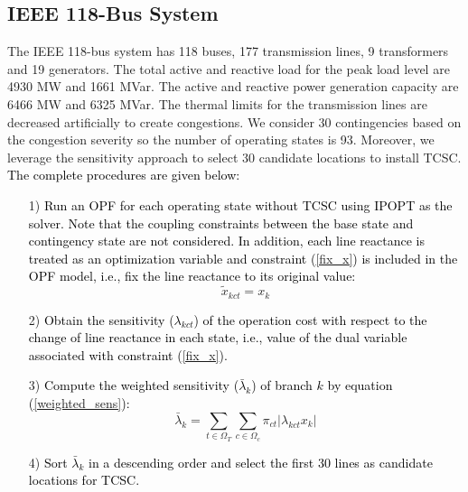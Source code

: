 \documentclass[journal]{IEEEtran}
\begin{document}
\subsection{IEEE 118-Bus System}
The IEEE 118-bus system has 118 buses, 177 transmission lines, 9 transformers and 19 generators. The total active and reactive load for the peak load level are 4930 MW and 1661 MVar. The active and reactive power generation capacity are 6466 MW and 6325 MVar. The thermal limits for the transmission lines are decreased artificially to create congestions. We consider 30 contingencies based on the congestion severity \cite{mybibb:automatic_contingency} so the number of operating states is 93. Moreover, we leverage the sensitivity approach \cite{mybibb:PSO_SQP_FACTS} to select 30 candidate locations to install TCSC. \textcolor{black}{The complete procedures are given below:}
\begin{enumerate}
	\item [1)] 	\textcolor{black}{Run an OPF for each operating state without TCSC using IPOPT as the solver. Note that the coupling constraints between the base state and contingency state are not considered. In addition, each line reactance is treated as an optimization variable and constraint (\ref{fix_x}) is included in the OPF model, i.e., fix the line reactance to its original value:}
	\begin{equation}
	\tilde{x}_{kct}=x_k  \label{fix_x}	
	\end{equation}
     \item [2)]  \textcolor{black}{Obtain the sensitivity ($\lambda_{kct}$) of the operation cost with respect to the change of line reactance in each state, i.e., value of the dual variable associated with constraint (\ref{fix_x}).}
     \item [3)] \textcolor{black}{Compute the weighted sensitivity ($\bar{\lambda}_k$) of branch $k$ by equation (\ref{weighted_sens}):}
     \begin{equation}
     \bar{\lambda}_k=\sum_{t\in \Omega_T} \sum_{c \in \Omega_c}\pi_{ct}|\lambda_{kct}x_k|  \label{weighted_sens}
     \end{equation}
     \item [4)] \textcolor{black}{Sort $\bar{\lambda}_k$ in a descending order and select the first 30 lines as candidate locations for TCSC.}
 \end{enumerate}
\end{document}
